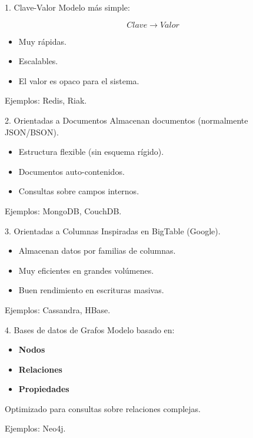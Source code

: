 \documentclass{beamer}
\begin{document}
\begin{frame}{1. Clave-Valor}
Modelo más simple:

\[
Clave \rightarrow Valor
\]

\begin{itemize}
    \item Muy rápidas.
    \item Escalables.
    \item El valor es opaco para el sistema.
\end{itemize}

\medskip
Ejemplos: Redis, Riak.
\end{frame}

\begin{frame}{2. Orientadas a Documentos}
Almacenan documentos (normalmente JSON/BSON).

\begin{itemize}
    \item Estructura flexible (sin esquema rígido).
    \item Documentos auto-contenidos.
    \item Consultas sobre campos internos.
\end{itemize}

\medskip
Ejemplos: MongoDB, CouchDB.
\end{frame}

\begin{frame}{3. Orientadas a Columnas}
Inspiradas en BigTable (Google).

\begin{itemize}
    \item Almacenan datos por familias de columnas.
    \item Muy eficientes en grandes volúmenes.
    \item Buen rendimiento en escrituras masivas.
\end{itemize}

\medskip
Ejemplos: Cassandra, HBase.
\end{frame}

\begin{frame}{4. Bases de datos de Grafos}
Modelo basado en:

\begin{itemize}
    \item \textbf{Nodos}
    \item \textbf{Relaciones}
    \item \textbf{Propiedades}
\end{itemize}

Optimizado para consultas sobre relaciones complejas.

\medskip
Ejemplos: Neo4j.
\end{frame}
\end{document}
